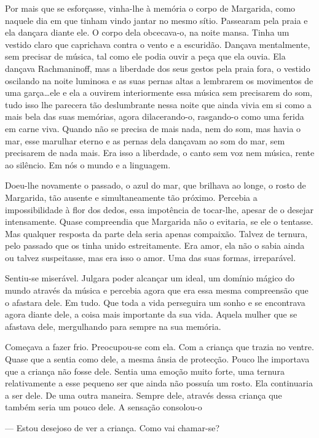 Por mais que se esforçasse, vinha-lhe à memória o corpo de Margarida,
como naquele dia em que tinham vindo jantar no mesmo sítio. Passearam
pela praia e ela dançara diante ele. O corpo dela obcecava-o, na noite
mansa. Tinha um vestido claro que caprichava contra o vento e a
escuridão. Dançava mentalmente, sem precisar de música, tal como ele
podia ouvir a peça que ela ouvia. Ela dançava Rachmaninoff, mas a
liberdade dos seus gestos pela praia fora, o vestido oscilando na noite
luminosa e as suas pernas altas a lembrarem os movimentos de uma
garça\ldots{}ele e ela a ouvirem interiormente essa música sem
precisarem do som, tudo isso lhe parecera tão deslumbrante nessa noite
que ainda vivia em si como a mais bela das suas memórias, agora
dilacerando-o, rasgando-o como uma ferida em carne viva. Quando não se
precisa de mais nada, nem do som, mas havia o mar, esse marulhar eterno
e as pernas dela dançavam ao som do mar, sem precisarem de nada mais.
Era isso a liberdade, o canto sem voz nem música, rente ao silêncio. Em
nós o mundo e a linguagem.

Doeu-lhe novamente o passado, o azul do mar, que brilhava ao longe, o
rosto de Margarida, tão ausente e simultaneamente tão próximo. Percebia
a impossibilidade à flor dos dedos, essa impotência de tocar-lhe, apesar
de o desejar intensamente. Quase compreendia que Margarida não o
evitaria, se ele o tentasse. Mas qualquer resposta da parte dela seria
apenas compaixão. Talvez de ternura, pelo passado que os tinha unido
estreitamente. Era amor, ela não o sabia ainda ou talvez suspeitasse,
mas era isso o amor. Uma das suas formas, irreparável.

Sentiu-se miserável. Julgara poder alcançar um ideal, um domínio mágico
do mundo através da música e percebia agora que era essa mesma
compreensão que o afastara dele. Em tudo. Que toda a vida perseguira um
sonho e se encontrava agora diante dele, a coisa mais importante da sua
vida. Aquela mulher que se afastava dele, mergulhando para sempre na sua
memória.

Começava a fazer frio. Preocupou-se com ela. Com a criança que trazia no
ventre. Quase que a sentia como dele, a mesma ânsia de protecção. Pouco
lhe importava que a criança não fosse dele. Sentia uma emoção muito
forte, uma ternura relativamente a esse pequeno ser que ainda não
possuía um rosto. Ela continuaria a ser dele. De uma outra maneira.
Sempre dele, através dessa criança que também seria um pouco dele. A
sensação consolou-o

--- Estou desejoso de ver a criança. Como vai chamar-se?

